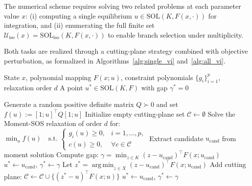 \documentclass[sn-basic,Numbered]{sn-jnl}
\theoremstyle{thmstyleone}%
\begin{document}
The numerical scheme requires solving two related problems at each parameter value $x$: (i) computing a single equilibrium $u \in \mathrm{SOL}(K, F(x,\cdot))$ for integration, and (ii) enumerating the full finite set $\mathcal{U}_{\mathrm{iso}}(x) = \mathrm{SOL}_{\mathrm{iso}}(K, F(x,\cdot))$ to enable branch selection under multiplicity.

Both tasks are realized through a cutting-plane strategy combined with objective perturbation, as formalized in Algorithms~\ref{alg:single_vi} and~\ref{alg:all_vi}.

\begin{algorithm}[htbp]
\caption{Compute a Single Solution of ($\mathrm{VI}(x)$)}
\label{alg:single_vi}
\begin{algorithmic}[1]
\Require State $x$, polynomial mapping $F(x; u)$, constraint polynomials $\{g_i\}_{i=1}^p$, relaxation order $d$
\Ensure A point $u^* \in \mathrm{SOL}(K,F)$ with gap $\gamma^* = 0$

\State Generate a random positive definite matrix $Q \succ 0$ and set $f(u) := [1; u]^\top Q [1; u]$
\State Initialize empty cutting-plane set $\mathcal{C} \gets \emptyset$
\Repeat
    \State Solve the Moment-SOS relaxation of order $d$ for: 
    \Statex $\displaystyle \min_{u} f(u) \quad \text{s.t. } \begin{cases} g_i(u) \geq 0, & i=1,\dots,p, \\ c(u) \geq 0, & \forall c \in \mathcal{C} \end{cases}$
    \State Extract candidate $u_{\text{cand}}$ from moment solution
    \State Compute gap: $\displaystyle \gamma = \min_{z \in K} (z - u_{\text{cand}})^\top F(x; u_{\text{cand}})$
        \State \Return $u^* \gets u_{\text{cand}}$, $\gamma^* \gets \gamma$
    \EndIf
    \State Let $z^* = \operatorname{arg\,min}_{z \in X} (z - u_{\text{cand}})^\top F(x; u_{\text{cand}})$
    \State Add cutting plane: $\mathcal{C} \gets \mathcal{C} \cup \{ (z^* - u)^\top F(x; u) \}$
\State \Return $u^* \gets u_{\text{cand}}$, $\gamma^* \gets \gamma$ 
\end{algorithmic}
\end{algorithm}
\end{document}
